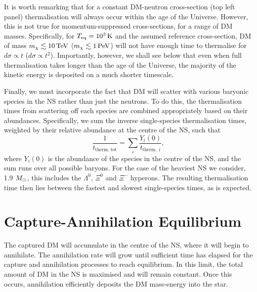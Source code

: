 It is worth remarking that for a constant DM-neutron cross-section (top left panel) thermalisation will always occur within the age of the Universe. However, this is not true for momentum-suppressed cross-sections, for a range of DM masses. Specifically, for $T_{\rm eq}=10^3{\rm \,K}$ and the assumed reference cross-section,  DM of mass $m_\chi\lesssim 10 {\rm \,TeV}$ ($m_\chi\lesssim 1 {\rm \,PeV}$)  will not have enough time to  thermalise  for $d\sigma \propto t$ ($d\sigma \propto t^2$).
Importantly, however, we shall see below that even when full thermalisation takes longer than the age of the Universe, the majority of the kinetic energy is deposited on a much shorter timescale.



Finally, we must incorporate the fact that DM will scatter with various baryonic species in the NS rather than just the neutrons. To do this, the thermalisation times from scattering off each species are combined appropriately based on their abundances. Specifically, we sum the inverse single-species thermalisation times, weighted by their relative abundance at the centre of the NS, such that
\begin{equation}
    \frac{1}{t_{\text{therm},\; \text{tot}}} = \sum_i \frac{Y_i(0)}{t_{\text{therm},\;i}},
    \label{ch6:eq:tthermtot}
\end{equation}
where $Y_i(0)$ is the abundance of the species in the centre of the NS, and the sum runs over all possible baryons. For the case of the heaviest NS we consider, 1.9 $M_\odot$, this includes the $\Lambda^0$, $\Xi^0$ and $\Xi^-$ hyperons. The resulting thermalisation time then lies between the fastest and slowest single-species times, as is expected.










\section{Capture-Annihilation Equilibrium}
\label{ch6:sec:CAEquilibrium}




The captured DM will accumulate in the centre of the NS, where it will begin to annihilate. The annihilation rate will grow until sufficient time has elapsed for the capture and annihilation processes to reach equilibrium. In this limit, the total amount of DM in the NS is maximised and will remain constant. Once this occurs, annihilation efficiently deposits the DM mass-energy into the star. 


